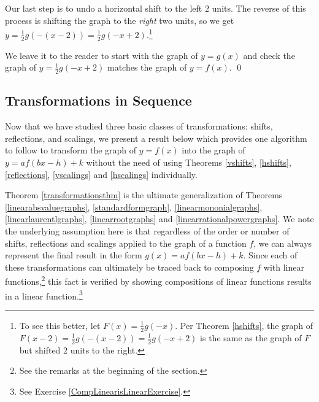 \documentclass{ximera}
\begin{document}
\begin{example}
\begin{enumerate}
 \smallskip
 
 Our last step is to undo a horizontal shift to the left $2$ units.  The reverse of this process is shifting the graph to the \textit{right} two units, so we get $y = \frac{1}{2} g(-(x-2)) = \frac{1}{2} g(-x+2)$.\footnote{To see this better, let $F(x) = \frac{1}{2} g(-x)$.  Per Theorem \ref{hshifts}, the graph of  $F(x-2) = \frac{1}{2} g(-(x-2)) = \frac{1}{2} g(-x+2)$ is the same as the graph of $F$ but shifted $2$ units to the right.}  
 
 \smallskip
 
 We leave it to the reader to start with the graph of $y=g(x)$ and check the graph of $y =  \frac{1}{2} g(-x+2)$ matches the graph of $y = f(x)$. \qed

\end{enumerate}

\end{example}

\subsection{Transformations in Sequence}
\label{TransformationsinSequence}


Now that we have studied  three basic classes of transformations:  shifts, reflections, and scalings, we present a result below which provides one algorithm to follow to transform the graph of $y=f(x)$ into the graph of $y=af(bx-h)+k$ without the need of using Theorems \ref{vshifts}, \ref{hshifts}, \ref{reflections}, \ref{vscalings} and \ref{hscalings} individually.  

\smallskip

Theorem \ref{transformationsthm} is the ultimate generalization of Theorems \ref{linearabsvaluegraphs}, \ref{standardformgraph}, \ref{linearmononialgraphs},  \ref{linearlaurentlgraphs}, \ref{linearrootgraphs} and \ref{linearrationalpowergraphs}.  We note the underlying assumption here is that regardless of the order or number of shifts, reflections and scalings applied to the graph of a function $f$, we can always represent the final result in the form $g(x) = a f(bx-h)+k$.   Since each of these transformations can ultimately be traced back to composing $f$ with linear functions,\footnote{See the remarks at the beginning of the section.} this fact is verified by showing compositions of linear functions results in a linear function.\footnote{See Exercise \ref{CompLinearisLinearExercise}.}

\smallskip
\end{document}
